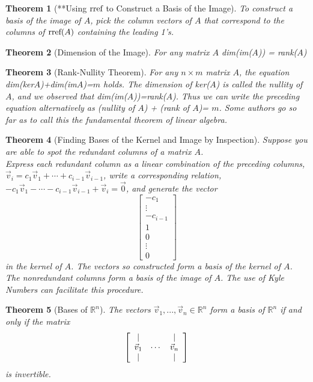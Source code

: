 \documentclass[10pt]{report}
\newtheorem{thm2}{Theorem}[section]
\newcommand{\rref}{\textup{rref}}
\begin{document}
\begin{thm2}[**Using $\rref$ to Construct a Basis of the Image]
To construct a basis of the image of $A$, pick the column vectors of $A$ that correspond to the columns of $\rref(A)$ containing the leading 1's.
\end{thm2}
\begin{thm2}[Dimension of the Image]
For any matrix $A$ dim(im($A$)) = rank($A$)
\end{thm2}
\begin{thm2}[Rank-Nullity Theorem]
For any $n\times m$ matrix $A$, the equation dim(ker$A$)+dim(im$A$)=$m$ holds. The dimension of ker($A$) is called the nullity of $A$, and we observed that dim(im($A$))=rank($A$). Thus we can write the preceding equation alternatively as (nullity of $A$) + (rank of $A$)= $m$. Some authors go so far as to call this the fundamental theorem of linear algebra.
\end{thm2}
\begin{thm2}[Finding Bases of the Kernel and Image by Inspection]
Suppose you are able to spot the redundant columns of a matrix $A$. \\
Express each redundant column as a linear combination of the preceding columns, $\vec{v}_i=c_1\vec{v}_1+ \cdots + c_{i-1}\vec{v}_{i-1}$, write a corresponding relation, $-c_1\vec{v}_1- \cdots - c_{i-1}\vec{v}_{i-1}+\vec{v}_i= \vec{0}$, and generate the vector
$$\left[\begin{array}{c}
-c_1\\
\vdots\\
-c_{i-1}\\
1\\
0\\
\vdots\\
0
\end{array}\right]$$
in the kernel of $A$. The vectors so constructed form a basis of the kernel of $A$. The nonredundant columns form a basis of the image of $A$. The use of Kyle Numbers can facilitate this procedure.
\end{thm2}
\begin{thm2}[Bases of $\mathbb{R}^n$]
The vectors $\vec{v}_1, ..., \vec{v}_n\in \mathbb{R}^n$ form a basis of $\mathbb{R}^n$ if and only if the matrix
$$\left[\begin{array}{c c c}
| & & |\\
\vec{v}_1 & \cdots & \vec{v}_n\\
| & & |
\end{array}\right]$$
is invertible.
\end{thm2}
\end{document}
